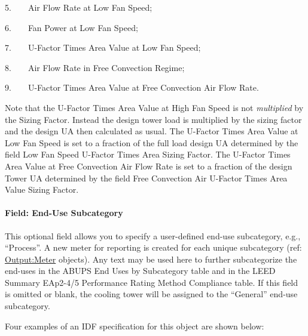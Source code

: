 5.~~~~Air Flow Rate at Low Fan Speed;

6.~~~~Fan Power at Low Fan Speed;

7.~~~~U-Factor Times Area Value at Low Fan Speed;

8.~~~~Air Flow Rate in Free Convection Regime;

9.~~~~U-Factor Times Area Value at Free Convection Air Flow Rate.

Note that the U-Factor Times Area Value at High Fan Speed is not \emph{multiplied} by the Sizing Factor. Instead the design tower load is multiplied by the sizing factor and the design UA then calculated as usual. The U-Factor Times Area Value at Low Fan Speed is set to a fraction of the full load design UA determined by the field Low Fan Speed U-Factor Times Area Sizing Factor. The U-Factor Times Area Value at Free Convection Air Flow Rate is set to a fraction of the design Tower UA determined by the field Free Convection Air U-Factor Times Area Value Sizing Factor.

\paragraph{Field: End-Use Subcategory}\label{end-use-subcategory-02}

This optional field allows you to specify a user-defined end-use subcategory, e.g., ``Process''. A new meter for reporting is created for each unique subcategory (ref: \hyperref[outputmeter-and-outputmetermeterfileonly]{Output:Meter} objects). Any text may be used here to further subcategorize the end-uses in the ABUPS End Uses by Subcategory table and in the LEED Summary EAp2-4/5 Performance Rating Method Compliance table. If this field is omitted or blank, the cooling tower will be assigned to the ``General'' end-use subcategory.

Four examples of an IDF specification for this object are shown below:

